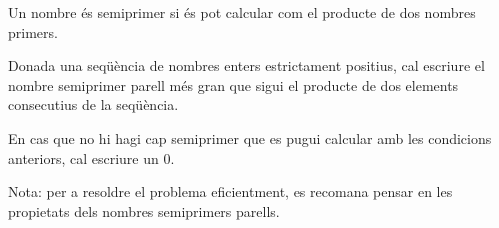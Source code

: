 

\Statement

Un nombre és semiprimer si és pot calcular com el producte de dos nombres primers.

\medskip

Donada una seqüència de nombres enters estrictament positius, cal
escriure el nombre semi\-primer parell més gran que sigui el producte de dos
elements consecutius de la seqüència.

\medskip

En cas que no hi hagi cap semiprimer que es pugui calcular amb les condicions anteriors,
cal escriure un 0.

\medskip

Nota: per a resoldre el problema eficientment, es recomana pensar en les propietats
dels nombres semiprimers parells.

\Sample